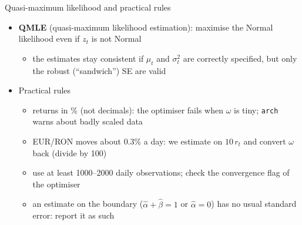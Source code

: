 \begin{frame}{Quasi-maximum likelihood and practical rules}
\itemsize{\small}
\begin{itemize}
    \item \textbf{QMLE} (quasi-maximum likelihood estimation): maximise the Normal likelihood even if $z_t$ is not Normal
    \begin{itemize}
        \item the estimates stay consistent if $\mu_t$ and $\sigma_t^2$ are correctly specified, but only the robust (``sandwich'') SE are valid 
    \end{itemize}
    \item Practical rules
    \begin{itemize}
        \item returns in \% (not decimals): the optimiser fails when $\omega$ is tiny; \texttt{arch} warns about badly scaled data
        \item EUR/RON moves about 0.3\% a day: we estimate on $10\,r_t$ and convert $\omega$ back (divide by 100)
        \item use at least 1000--2000 daily observations; check the convergence flag of the optimiser
        \item an estimate on the boundary ($\hat\alpha + \hat\beta = 1$ or $\hat\alpha = 0$) has no usual standard error: report it as such
    \end{itemize}
\end{itemize}
\end{frame}

